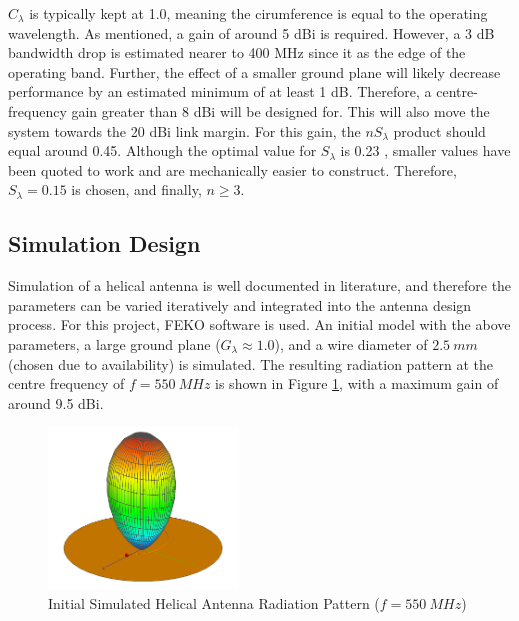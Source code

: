 $C_\lambda$ is typically kept at 1.0, meaning the cirumference is equal to the operating wavelength. As mentioned, a gain of around 5 dBi is required. However, a 3 dB bandwidth drop is estimated nearer to 400 MHz since it as the edge of the operating band. Further, the effect of a smaller ground plane will likely decrease performance by an estimated minimum of at least 1 dB. Therefore, a centre-frequency gain greater than 8 dBi will be designed for. This will also move the system towards the 20 dBi link margin. For this gain, the $n S_\lambda$ product should equal around 0.45. Although the optimal value for $S_\lambda$ is 0.23 \cite{textbook-antennaTheoryAnalysisDesign}, smaller values have been quoted to work \cite{site-helicalCalculator} and are mechanically easier to construct. Therefore, $S_\lambda = 0.15$ is chosen, and finally, $n \geq 3$.

\subsection{Simulation Design}
Simulation of a helical antenna is well documented in literature, and therefore the parameters can be varied iteratively and integrated into the antenna design process. For this project, FEKO software is used. An initial model with the above parameters, a large ground plane ($G_\lambda \approx 1.0$), and a wire diameter of $\SI{2.5}{mm}$ (chosen due to availability) is simulated. The resulting radiation pattern at the centre frequency of $f = \SI{550}{MHz}$ is shown in Figure \ref{fig:helix1_pattern_550MHz}, with a maximum gain of around 9.5 dBi.

\begin{figure}[!htb]
  \centering
  \includegraphics[width=0.45\textwidth]{helix1_pattern_550MHz}
  \caption{Initial Simulated Helical Antenna Radiation Pattern ($f=\SI{550}{MHz}$)}
  \label{fig:helix1_pattern_550MHz}
\end{figure}

